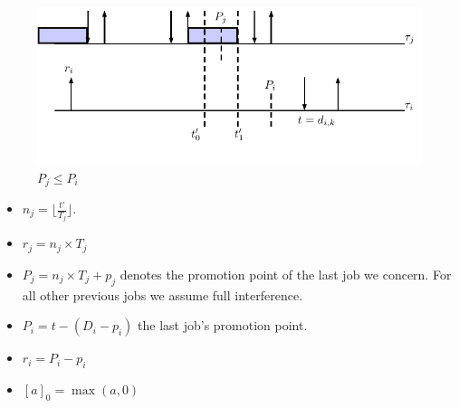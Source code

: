 \documentclass[12pt,conference,onecolumn]{IEEEtran}
\begin{document}



\begin{figure}[h!]
 \centering
\includegraphics[scale=1]{Figure/C1}  
\caption{$ P_j\leq P_i$}
  \label{fig:p3}
\end{figure}
\begin{itemize}[\textbf{Property and Notations}]
	\item $n_j=\lfloor \frac{t'}{T_j}\rfloor$.
	\item $r_j=n_j\times T_j$
	\item   $P_j=n_j\times T_j+p_j$ denotes the promotion point of the last job we concern. For all other previous jobs we assume full interference.
	\item $P_i=t-(D_i-p_i)$ the last job's promotion point.
	\item $r_i=P_i-p_i$
	\item $[a]_0=\max(a,0)$
\end{itemize}
\end{document}
